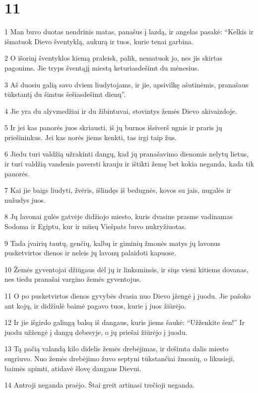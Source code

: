 \chapter{11}


\par 1 Man buvo duotas nendrinis matas, panašus į lazdą, ir angelas pasakė: “Kelkis ir išmatuok Dievo šventyklą, aukurą ir tuos, kurie tenai garbina. 
\par 2 O išorinį šventyklos kiemą praleisk, palik, nematuok jo, nes jis skirtas pagonims. Jie tryps šventąjį miestą keturiasdešimt du mėnesius. 
\par 3 Aš duosiu galią savo dviem liudytojams, ir jie, apsivilkę ašutinėmis, pranašaus tūkstantį du šimtus šešiasdešimt dienų”. 
\par 4 Jie yra du alyvmedžiai ir du žibintuvai, stovintys žemės Dievo akivaizdoje. 
\par 5 Ir jei kas panorės juos skriausti, iš jų burnos išsiverš ugnis ir praris jų priešininkus. Jei kas norės jiems kenkti, tas irgi taip žus. 
\par 6 Jiedu turi valdžią užrakinti dangų, kad jų pranašavimo dienomis nelytų lietus, ir turi valdžią vandenis paversti krauju ir ištikti žemę bet kokia neganda, kada tik panorės. 
\par 7 Kai jie baigs liudyti, žvėris, išlindęs iš bedugnės, kovos su jais, nugalės ir nužudys juos. 
\par 8 Jų lavonai gulės gatvėje didžiojo miesto, kuris dvasine prasme vadinamas Sodoma ir Egiptu, kur ir mūsų Viešpats buvo nukryžiuotas. 
\par 9 Tada įvairių tautų, genčių, kalbų ir giminių žmonės matys jų lavonus pusketvirtos dienos ir neleis jų lavonų palaidoti kapuose. 
\par 10 Žemės gyventojai džiūgaus dėl jų ir linksminsis, ir siųs vieni kitiems dovanas, nes tiedu pranašai vargino žemės gyventojus. 
\par 11 O po pusketvirtos dienos gyvybės dvasia nuo Dievo įžengė į juodu. Jie pašoko ant kojų, ir didžiulė baimė pagavo tuos, kurie į juos žiūrėjo. 
\par 12 Ir jie išgirdo galingą balsą iš dangaus, kuris jiems šaukė: “Užženkite šen!” Ir juodu užžengė į dangų debesyje, o jų priešai žiūrėjo į juodu. 
\par 13 Tą pačią valandą kilo didelis žemės drebėjimas, ir dešimta dalis miesto sugriuvo. Nuo žemės drebėjimo žuvo septyni tūkstančiai žmonių, o likusieji, baimės apimti, atidavė šlovę dangaus Dievui. 
\par 14 Antroji neganda praėjo. Štai greit artinasi trečioji neganda. 
